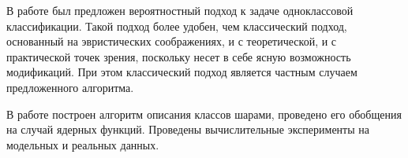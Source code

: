 В работе был предложен вероятностный подход к задаче одноклассовой классификации. Такой подход более удобен, чем классический подход, основанный на эвристических соображениях, и с теоретической, и с практической точек зрения, поскольку несет в себе ясную возможность модификаций. При этом классический подход является частным случаем предложенного алгоритма.

В работе построен алгоритм описания классов шарами, проведено его обобщения на случай ядерных функций. Проведены вычислительные эксперименты на модельных и реальных данных.